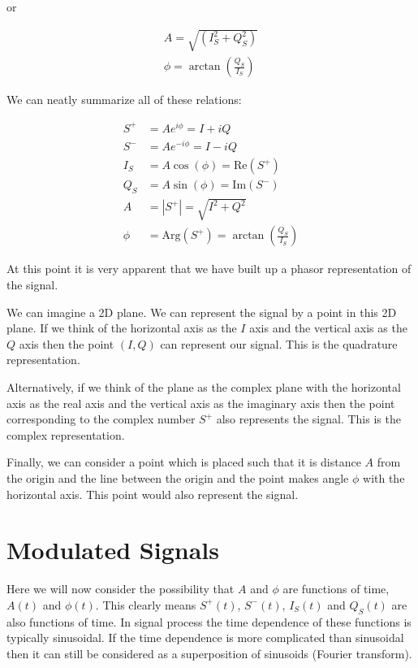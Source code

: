 \documentclass[12pt]{article}
\begin{document}
or

\begin{align}
A = \sqrt{(I_S^2 + Q_S^2)}\\
\phi = \arctan\left(\frac{Q_S}{I_S} \right)
\end{align}

We can neatly summarize all of these relations:

\begin{align}
S^+ &= Ae^{i\phi} = I + i Q\\
S^- &= Ae^{-i\phi} = I - i Q\\
I_S &= A\cos(\phi) = \text{Re}(S^+)\\
Q_S &= A\sin(\phi) = \text{Im}(S^-)\\
A &= |S^+| = \sqrt{I^2 + Q^2}\\
\phi &= \text{Arg}(S^+) = \arctan\left(\frac{Q_S}{I_S}\right)
\end{align}

At this point it is very apparent that we have built up a phasor representation of the signal. 

We can imagine a 2D plane. We can represent the signal by a point in this 2D plane. If we think of the horizontal axis as the $I$ axis and the vertical axis as the $Q$ axis then the point $(I, Q)$ can represent our signal. This is the quadrature representation. 

Alternatively, if we think of the plane as the complex plane with the horizontal axis as the real axis and the vertical axis as the imaginary axis then the point corresponding to the complex number $S^+$ also represents the signal. This is the complex representation.

Finally, we can consider a point which is placed such that it is distance $A$ from the origin and the line between the origin and the point makes angle $\phi$ with the horizontal axis. This point would also represent the signal.

\section{Modulated Signals}

Here we will now consider the possibility that $A$ and $\phi$ are functions of time, $A(t)$ and $\phi(t)$. This clearly means $S^+(t)$, $S^-(t)$, $I_S(t)$ and $Q_S(t)$ are also functions of time. In signal process the time dependence of these functions is typically sinusoidal. If the time dependence is more complicated than sinusoidal then it can still be considered as a superposition of sinusoids (Fourier transform).
\end{document}
